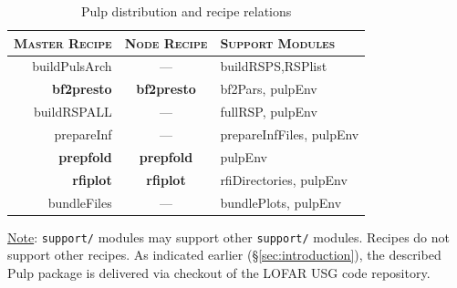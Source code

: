 \documentclass[a4paper,10pt,bibtotoc]{scrartcl}
\begin{document}
\begin{table}[ht]
\centering
\begin{tabular}{|r|c|l|}
\hline
\textsc{Master Recipe} &\textsc{Node Recipe}&\textsc{Support Modules}\\
\hline \hline
buildPulsArch & --- & buildRSPS,RSPlist\\
\hline
    \textbf{bf2presto} & \textbf{bf2presto} & bf2Pars, pulpEnv\\
\hline
  buildRSPALL &    ---    & fullRSP, pulpEnv\\
\cline{1-2}
   prepareInf &    ---    & prepareInfFiles, pulpEnv\\
\hline
    \textbf{prepfold} & \textbf{prepfold}  & pulpEnv\\
\hline
      \textbf{rfiplot} &\textbf{rfiplot}   & rfiDirectories, pulpEnv\\
\hline
bundleFiles &    ---    & bundlePlots, pulpEnv\\
\hline
\end{tabular}
  \caption{Pulp distribution and recipe relations}
  \label{tab:recipeTable}
\end{table}

\underline{Note}: \verb|support/| modules may support other
\verb|support/| modules. Recipes do not support other recipes.
\newline
As indicated earlier (\S \ref{sec:introduction}), the described Pulp
package is delivered via checkout of the LOFAR USG code repository.
\end{document}
